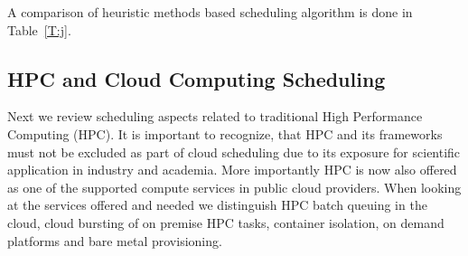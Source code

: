 \documentclass[final,5p,times,twocolumn]{elsarticle}
\begin{document}
A comparison of heuristic methods based scheduling
algorithm is done in Table~\ref{T:j}.








\subsection{HPC and Cloud Computing Scheduling}
\label{sec:hpc}


Next we review scheduling aspects related to traditional High
Performance Computing (HPC). It is important to recognize, that HPC
and its frameworks must not be excluded as part of cloud scheduling
due to its exposure for scientific application in industry and
academia. More importantly HPC is now also offered as one of the supported
compute services in public cloud providers. When looking at the services offered
and needed we distinguish HPC batch queuing in the cloud, cloud
bursting of on premise HPC tasks, container isolation, on demand
platforms and bare metal provisioning.
\end{document}
